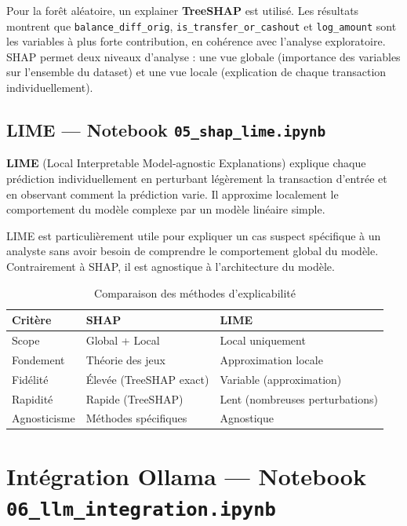 \documentclass[12pt,a4paper,twoside]{report}
\begin{document}
Pour la forêt aléatoire, un explainer \textbf{TreeSHAP} est utilisé. Les résultats montrent que \texttt{balance\_diff\_orig}, \texttt{is\_transfer\_or\_cashout} et \texttt{log\_amount} sont les variables à plus forte contribution, en cohérence avec l'analyse exploratoire. SHAP permet deux niveaux d'analyse : une vue globale (importance des variables sur l'ensemble du dataset) et une vue locale (explication de chaque transaction individuellement).

\subsection{LIME --- Notebook \texttt{05\_shap\_lime.ipynb}}

\begin{definitionbox}
\textbf{LIME} (Local Interpretable Model-agnostic Explanations) explique chaque prédiction individuellement en perturbant légèrement la transaction d'entrée et en observant comment la prédiction varie. Il approxime localement le comportement du modèle complexe par un modèle linéaire simple.
\end{definitionbox}

LIME est particulièrement utile pour expliquer un cas suspect spécifique à un analyste sans avoir besoin de comprendre le comportement global du modèle. Contrairement à SHAP, il est agnostique à l'architecture du modèle.

\begin{table}[H]
\centering
\caption{Comparaison des méthodes d'explicabilité}
\label{tab:shap_lime}
\begin{tabular}{lll}
\toprule
\textbf{Critère} & \textbf{SHAP}                    & \textbf{LIME} \\
\midrule
Scope            & Global + Local                   & Local uniquement \\
Fondement        & Théorie des jeux                 & Approximation locale \\
Fidélité         & Élevée (TreeSHAP exact)          & Variable (approximation) \\
Rapidité         & Rapide (TreeSHAP)                & Lent (nombreuses perturbations) \\
Agnosticisme     & Méthodes spécifiques             & Agnostique \\
\bottomrule
\end{tabular}
\end{table}

\section{Intégration Ollama --- Notebook \texttt{06\_llm\_integration.ipynb}}
\end{document}
